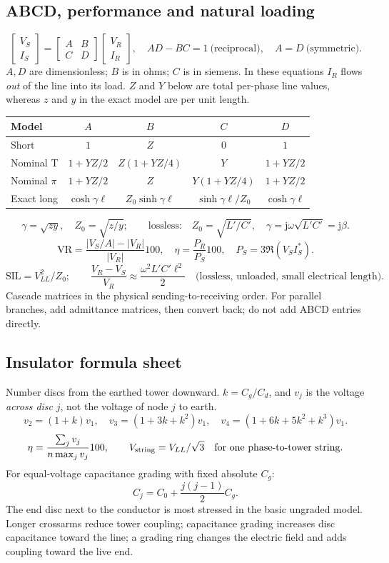 \documentclass[11pt,a4paper]{article}
\newcommand{\jj}{\mathrm j}
\begin{document}
\subsection{ABCD, performance and natural loading}
\[
 \begin{bmatrix}V_S\\I_S\end{bmatrix}=
 \begin{bmatrix}A&B\\C&D\end{bmatrix}\begin{bmatrix}V_R\\I_R\end{bmatrix},\quad
 AD-BC=1\ \text{(reciprocal)},\quad A=D\ \text{(symmetric)}.
\]
$A,D$ are dimensionless; $B$ is in ohms; $C$ is in siemens. In these equations $I_R$ flows \emph{out} of the line into its load. $Z$ and $Y$ below are total per-phase line values, whereas $z$ and $y$ in the exact model are per unit length.
\begin{center}\small
\begin{tabular}{lcccc}
\toprule Model & $A$ & $B$ & $C$ & $D$\\\midrule
Short & $1$ & $Z$ & $0$ & $1$\\
Nominal T & $1+YZ/2$ & $Z(1+YZ/4)$ & $Y$ & $1+YZ/2$\\
Nominal $\pi$ & $1+YZ/2$ & $Z$ & $Y(1+YZ/4)$ & $1+YZ/2$\\
Exact long & $\cosh\gamma\ell$ & $Z_0\sinh\gamma\ell$ & $\sinh\gamma\ell/Z_0$ & $\cosh\gamma\ell$\\\bottomrule
\end{tabular}\end{center}
\[
 \gamma=\sqrt{zy},\quad Z_0=\sqrt{z/y};\qquad
 \text{lossless:}\quad Z_0=\sqrt{L'/C'},\quad\gamma=\jj\omega\sqrt{L'C'}=\jj\beta.
\]
\[
 \mathrm{VR}=\frac{|V_S/A|-|V_R|}{|V_R|}100,\quad
 \eta=\frac{P_R}{P_S}100,\quad P_S=3\Re(V_S I_S^*).
\]
\[
 \mathrm{SIL}=V_{LL}^2/Z_0;\qquad
 \frac{V_R-V_S}{V_R}\approx\frac{\omega^2L'C'\ell^2}{2}
 \quad\text{(lossless, unloaded, small electrical length)}.
\]
Cascade matrices in the physical sending-to-receiving order. For parallel branches, add admittance matrices, then convert back; do not add ABCD entries directly.

\subsection{Insulator formula sheet}
Number discs from the earthed tower downward. $k=C_g/C_d$, and $v_j$ is the voltage \emph{across disc} $j$, not the voltage of node $j$ to earth.
\[
 v_2=(1+k)v_1,\quad v_3=(1+3k+k^2)v_1,\quad
 v_4=(1+6k+5k^2+k^3)v_1.
\]
\[
 \eta=\frac{\sum_jv_j}{n\max_jv_j}100,\qquad
 V_{\rm string}=V_{LL}/\sqrt3\quad\text{for one phase-to-tower string}.
\]
For equal-voltage capacitance grading with fixed absolute $C_g$:
\[
 C_j=C_0+\frac{j(j-1)}2C_g.
\]
The end disc next to the conductor is most stressed in the basic ungraded model. Longer crossarms reduce tower coupling; capacitance grading increases disc capacitance toward the line; a grading ring changes the electric field and adds coupling toward the live end.
\end{document}
